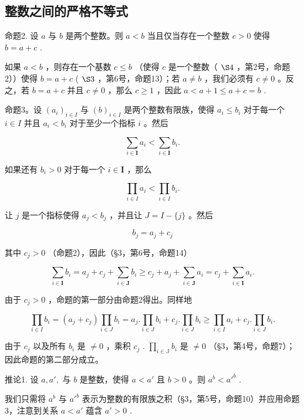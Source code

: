 \subsection{整数之间的严格不等式}

命题2. 设 \(a\) 与 \(b\) 是两个整数。则 \(a < b\) 当且仅当存在一个整数 \(c > 0\) 使得 \(b = a + c\) .

如果 \(a < b\) ，则存在一个基数 \(c \leqslant b\) （使得 \(c\) 是一个整数（ \(\S 4\) ，第2号，命题2））使得 \(b = a + c\) ( \(\S 3\) ，第6号，命题13）；若 \(a \neq b\) ，我们必须有 \(c \neq 0\) 。反之，若 \(b = a + c\) 并且 \(c \neq 0\) ，那么 \(c \geqslant 1\) ，因此 \(a < a + 1 \leqslant a + c = b\) .

命题3。设 \((a_i)_{i \in I}\) 与 \((b)_{i \in I}\) 是两个整数有限族，使得 \(a_i \leqslant b_i\) 对于每一个 \(i \in I\) 并且 \(a_i < b_i\) 对于至少一个指标 \(i\) 。然后

\[
\sum_ {i \in \mathbf {I}} a _ {i} <   \sum_ {i \in \mathbf {I}} b _ {i}.
\]

如果还有 \(b_{i} > 0\) 对于每一个 \(i \in \mathbf{I}\) ，那么

\[
\prod_ {i \in I} a _ {i} <   \prod_ {i \in I} b _ {i}.
\]

让 \(j\) 是一个指标使得 \(a_{j} < b_{j}\) ，并且让 \(J = I - \{j\}\) 。然后

\[
b _ {j} = a _ {j} + c _ {j}
\]

其中 \(c_{j} > 0\) （命题2），因此（§3，第6号，命题14）

\[
\sum_ {i \in \mathbf {I}} b _ {i} = a _ {j} + c _ {j} + \sum_ {i \in \mathbf {J}} b _ {i} \geqslant c _ {j} + a _ {j} + \sum_ {i \in \mathbf {J}} a _ {i} = c _ {j} + \sum_ {i \in \mathbf {I}} a _ {i}.
\]

由于 \(c_{j} > 0\) ，命题的第一部分由命题2得出。同样地

\[
\prod_ {i \in I} b _ {i} = (a _ {j} + c _ {j}) \prod_ {i \in J} b _ {i} = a _ {j}. \prod_ {i \in J} b _ {i} + c _ {j}. \prod_ {i \in J} b _ {i} \geqslant \prod_ {i \in I} a _ {i} + c _ {j}. \prod_ {i \in J} b _ {i}.
\]

由于 \(c_{j}\) 以及所有 \(b_{i}\) 是 \(\neq 0\) ，乘积 \(c_{j}\) . \(\prod_{i \in \mathbb{J}} b_{i}\) 是 \(\neq 0\) （§3，第4号，命题7）；因此命题的第二部分成立。

推论1. 设 \(a, a',\) 与 \(b\) 是整数，使得 \(a < a'\) 且 \(b > 0\) 。则 \(a^b < a'^b\) .

我们只需将 \(a^b\) 与 \(a'^b\) 表示为整数的有限族之积（§3，第5号，命题10）并应用命题3，注意到关系 \(a < a'\) 蕴含 \(a' > 0\) .

